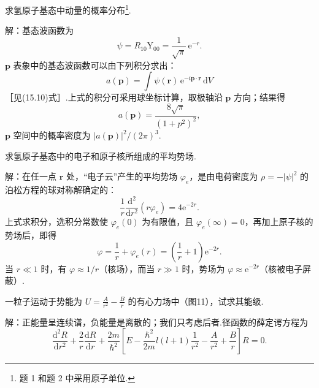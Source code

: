 \begin{xiti}

\quad 求氢原子基态中动量的概率分布\footnote{题 1 和题 2 中采用原子单位.}.

解：基态波函数为
\begin{equation*}
  \psi=R_{10}\mathrm{Y}_{00}=\frac{1}{\sqrt{\pi}}\,\mathrm{e}^{-r}.
\end{equation*}
$\boldsymbol{p}$ 表象中的基态波函数可以由下列积分求出：
\begin{equation*}
  a(\boldsymbol{p})=\int\psi(\boldsymbol{r})\,\mathrm{e}^{-i\boldsymbol{p}\cdot\boldsymbol{r}}\,\mathrm{d}V
\end{equation*}
［见(15.10)式］.上式的积分可采用球坐标计算，取极轴沿 $\boldsymbol{p}$ 方向；结果得
\begin{equation*}
  a(\boldsymbol{p})=\frac{8\sqrt{\pi}}{(1+p^2)^2},
\end{equation*}
$\boldsymbol{p}$ 空间中的概率密度为 $|a(\boldsymbol{p})|^2/(2\pi)^3$.

\quad 求氢原子基态中的电子和原子核所组成的平均势场.

解：在任一点 $\boldsymbol{r}$ 处，“电子云”产生的平均势场 $\varphi_e$，是由电荷密度为 $\rho=-|\psi|^2$ 的泊松方程的球对称解确定的：
\begin{equation*}
  \frac{1}{r}\frac{\mathrm{d}^2}{\mathrm{d}r^2}(r\varphi_e)=4\mathrm{e}^{-2r}.
\end{equation*}
上式求积分，选积分常数使 $\varphi_e(0)$ 为有限值，且 $\varphi_e(\infty)=0$，再加上原子核的势场后，即得
\begin{equation*}
  \varphi=\frac{1}{r}+\varphi_e(r)=\left(\frac{1}{r}+1\right)\mathrm{e}^{-2r}.
\end{equation*}
当 $r\ll1$ 时，有 $\varphi\approx1/r$（核场），而当 $r\gg1$ 时，势场为 $\varphi\approx\mathrm{e}^{-2r}$（核被电子屏蔽）.

\quad 一粒子运动于势能为 $U=\frac{A}{r^2}-\frac{B}{r}$ 的有心力场中（图11），试求其能级.

解：正能量呈连续谱，负能量是离散的；我们只考虑后者.径函数的薛定谔方程为
\setcounter{equation}{0}\renewcommand{\theequation}{\arabic{equation}}%
\begin{equation}
  \frac{\mathrm{d}^2R}{\mathrm{d}r^2}+\frac{2}{r}\frac{\mathrm{d}R}{\mathrm{d}r}
  +\frac{2m}{\hbar^2}\left[E-\frac{\hbar^2}{2m}l(l+1)\frac{1}{r^2}
  -\frac{A}{r^2}+\frac{B}{r}\right]R=0.
\end{equation}


\end{xiti}
